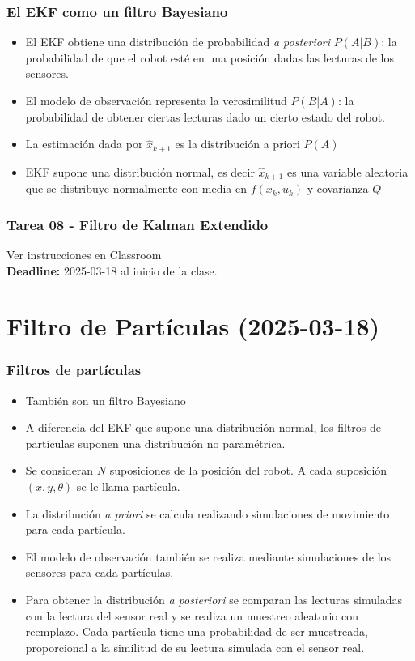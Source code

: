 \begin{frame}\frametitle{El EKF como un filtro Bayesiano}
  \begin{itemize}
  \item El EKF obtiene una distribución de probabilidad \textit{a posteriori} $P(A|B)$: la probabilidad de que el robot esté en una posición dadas las lecturas de los sensores.
  \item El modelo de observación representa la verosimilitud $P(B|A)$: la probabilidad de obtener ciertas lecturas dado un cierto estado del robot.
  \item La estimación dada por $\hat{x}_{k+1}$ es la distribución a priori $P(A)$
  \item EKF supone una distribución normal, es decir $\hat{x}_{k+1}$ es una variable aleatoria que se distribuye normalmente con media en $f(x_k, u_k)$ y covarianza $Q$
  \end{itemize}
\end{frame}

\begin{frame}[containsverbatim]\frametitle{Tarea 08 - Filtro de Kalman Extendido}
  Ver instrucciones en Classroom
  \[\]
  \textbf{Deadline: } 2025-03-18 al inicio de la clase. 
\end{frame}


\section{Filtro de Partículas (2025-03-18)}
  
\begin{frame}\frametitle{Filtros de partículas}
  \begin{itemize}
  \item También son un filtro Bayesiano
  \item A diferencia del EKF que supone una distribución normal, los filtros de partículas suponen una distribución no paramétrica.
  \item Se consideran $N$ suposiciones de la posición del robot. A cada suposición $(x,y,\theta)$ se le llama partícula. 
  \item La distribución \textit{a priori} se calcula realizando simulaciones de movimiento para cada partícula.
  \item El modelo de observación también se realiza mediante simulaciones de los sensores para cada partículas.
  \item Para obtener la distribución \textit{a posteriori} se comparan las lecturas simuladas con la lectura del sensor real y se realiza un muestreo aleatorio con reemplazo. Cada partícula tiene una probabilidad de ser muestreada, proporcional a la similitud de su lectura simulada con el sensor real.
  \end{itemize}
\end{frame}

